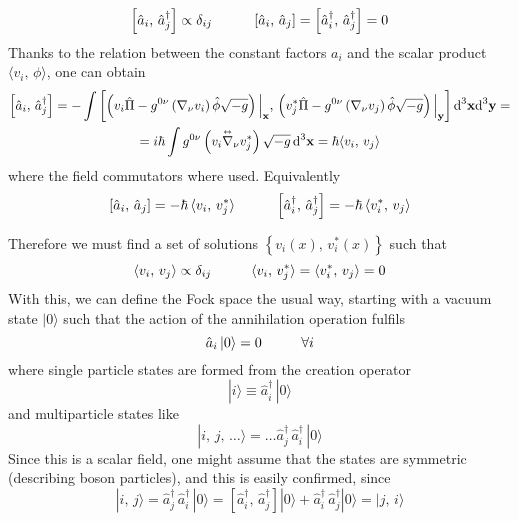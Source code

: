 \begin{equation}
	\left[\hat{a}_i,\,\hat{a}_j^\dagger\right]\propto \delta_{ij}\hspace{1.0cm}\left[\hat{a}_i,\,\hat{a}_j\right]=\left[\hat{a}_i^\dagger,\,\hat{a}_j^\dagger\right]=0
\end{equation}
Thanks to the relation between the constant factors $a_i$ and the scalar product $\langle v_i,\,\phi\rangle$, one can obtain
\begin{multline}
	\left[\hat{a}_i,\,\hat{a}_j^\dagger\right]=-\int\left[\left(v_i\hat{\Pi}-g^{0\nu}\left(\nabla_\nu v_i\right)\hat{\phi}\sqrt{-g}\right)\Big|_\mathbf{x},\,\left(v_j^*\hat{\Pi}-g^{0\nu}\left(\nabla_\nu v_j\right)\hat{\phi}\sqrt{-g}\right)\Big|_\mathbf{y}\right]\text{d}^3\mathbf{x}\text{d}^3\mathbf{y}=\\
	=i\hbar\int g^{0\nu}\left(v_i\overset{\text{\tiny$\leftrightarrow$}}{\nabla}_\nu v_j^*\right)\sqrt{-g}\,\text{d}^3\mathbf{x}=\hbar\langle v_i,\,v_j\rangle
\end{multline}
where the field commutators where used. Equivalently 
\begin{equation}
	\left[\hat{a}_i,\,\hat{a}_j\right]=-\hbar\,\langle v_i,\,v_j^*\rangle\hspace{1.0cm}\left[\hat{a}_i^\dagger,\,\hat{a}_j^\dagger\right]=-\hbar\,\langle v_i^*,\,v_j\rangle
\end{equation}

Therefore we must find a set of solutions $\left\{v_i(x),\,v_i^*(x)\right\}$ such that
\begin{equation}
	\langle v_i,\,v_j\rangle\propto \delta_{ij}\hspace{1.0cm}\langle v_i,\,v_j^*\rangle=\langle v_i^*,\,v_j\rangle=0
\end{equation}
With this, we can define the Fock space the usual way, starting with a vacuum state $|0\rangle$ such that the action of the annihilation operation fulfils
\begin{equation}
	\hat{a}_i\,|0\rangle=0\hspace{1.0cm}\forall i
\end{equation}
where single particle states are formed from the creation operator
\begin{equation}
	|i\rangle\equiv \hat{a}^\dagger_i\,|0\rangle
\end{equation}
and multiparticle states like
\begin{equation}
	|i,\,j,\,\hdots\rangle=\hdots \hat{a}_j^\dagger\,\hat{a}_i^\dagger\,|0\rangle
\end{equation}
Since this is a scalar field, one might assume that the states are symmetric (describing boson particles), and this is easily confirmed, since
\begin{equation}
	|i,\,j\rangle=\hat{a}_j^\dagger\,\hat{a}_i^\dagger\,|0\rangle=\left[\hat{a}_i^\dagger,\,\hat{a}_j^\dagger\right]|0\rangle+\hat{a}_i^\dagger\,\hat{a}_j^\dagger|0\rangle=|j,\,i\rangle
\end{equation}
